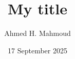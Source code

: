 \documentclass[12pt] {article}
\begin{document}
\title{My title}
\author{Ahmed H. Mahmoud}
\date{17 September 2025} 

\maketitle
\end{document}
